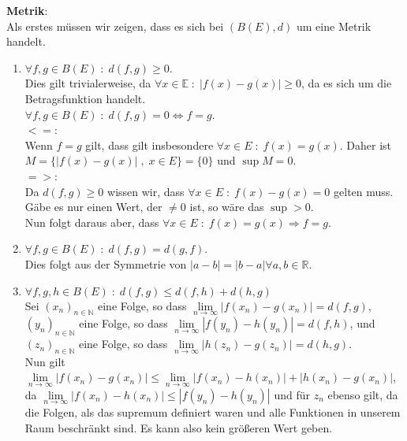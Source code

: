 \textbf{Metrik}:\\
Als erstes müssen wir zeigen, dass es sich bei $(B(E),d)$ um eine Metrik handelt.
\begin{enumerate}[1.]
    \item $\forall f,g \in B(E) \; : \; d(f,g) \geq 0$.\\
        Dies gilt trivialerweise, da $\forall x \in \mathbb{E} \; : \; |f(x) - g(x)| \geq 0$, da es sich um
        die Betragsfunktion handelt.\\
        $\forall f,g \in B(E) \; : \; d(f,g) = 0 \Leftrightarrow f = g$.\\
        $<=$:\\
            Wenn $f=g$ gilt, dass gilt insbesondere $\forall x \in E \; : \; f(x) = g(x)$.
            Daher ist $M = \{ |f(x) - g(x)| \; , \; x \in E\} = \{ 0 \}$ und $\sup M = 0$.\\
        $=>$:\\
            Da $d(f,g) \geq 0$ wissen wir, dass $\forall x \in E \; : \; f(x) - g(x) = 0$ gelten muss.
            Gäbe es nur einen Wert, der $\not= 0$ ist, so wäre das $\sup > 0$.\\
            Nun folgt daraus aber, dass $\forall x \in E \; : \; f(x) = g(x) \Rightarrow f = g$.
    \item $\forall f,g \in B(E) \; : \; d(f,g) = d(g,f)$.\\
        Dies folgt aus der Symmetrie von $|a - b| = |b - a| \forall a,b \in \mathbb{R}$.
    \item $\forall f,g,h \in B(E) \; : \; d(f,g) \leq d(f,h) + d(h,g)$\\
        Sei $(x_n)_{n\in\mathbb{N}}$ eine Folge, so dass $\underset{n \rightarrow \infty}{\lim} |f (x_n) - g(x_n)| = d(f,g)$,
        $(y_n)_{n\in\mathbb{N}}$ eine Folge, so dass $\underset{n \rightarrow \infty}{\lim} |f(y_n) - h (y_n)| = d(f,h)$,
        und $(z_n)_{n\in\mathbb{N}}$ eine Folge, so dass $\underset{n \rightarrow \infty}{\lim} |h (z_n) - g(z_n)| = d(h,g)$.\\

        Nun gilt $\underset{n \rightarrow \infty}{\lim} |f (x_n) - g (x_n) | \leq \underset{n \rightarrow \infty}{\lim} | f(x_n) - h (x_n) | + | h(x_n) - g(x_n)|$,
        da $\underset{n \rightarrow \infty}{\lim} |f(x_n) - h(x_n)| \leq |f(y_n) - h(y_n)|$ und für $z_n$ ebenso gilt, da die Folgen,
        als das supremum definiert waren und alle Funktionen in unserem Raum beschränkt sind. Es kann also kein größeren Wert geben.
\end{enumerate}



